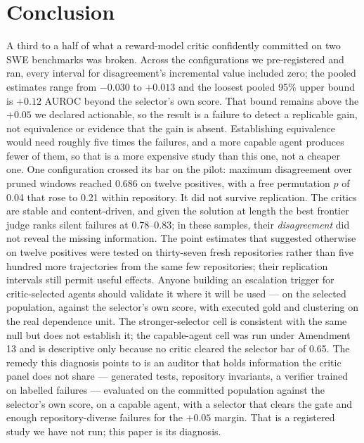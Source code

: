 \documentclass[11pt]{article}
\begin{document}
\section{Conclusion}
A third to a half of what a reward-model critic confidently committed on two SWE benchmarks was broken. Across the configurations we pre-registered and ran, every interval for disagreement's incremental value included zero; the pooled estimates range from $-0.030$ to $+0.013$ and the loosest pooled 95\% upper bound is $+0.12$ AUROC beyond the selector's own score. That bound remains above the $+0.05$ we declared actionable, so the result is a failure to detect a replicable gain, not equivalence or evidence that the gain is absent. Establishing equivalence would need roughly five times the failures, and a more capable agent produces fewer of them, so that is a more expensive study than this one, not a cheaper one. One configuration crossed its bar on the pilot: maximum disagreement over pruned windows reached 0.686 on twelve positives, with a free permutation $p$ of 0.04 that rose to 0.21 within repository. It did not survive replication. The critics are stable and content-driven, and given the solution at length the best frontier judge ranks silent failures at 0.78--0.83; in these samples, their \emph{disagreement} did not reveal the missing information. The point estimates that suggested otherwise on twelve positives were tested on thirty-seven fresh repositories rather than five hundred more trajectories from the same few repositories; their replication intervals still permit useful effects. Anyone building an escalation trigger for critic-selected agents should validate it where it will be used --- on the selected population, against the selector's own score, with executed gold and clustering on the real dependence unit. The stronger-selector cell is consistent with the same null but does not establish it; the capable-agent cell was run under Amendment 13 and is descriptive only because no critic cleared the selector bar of 0.65. The remedy this diagnosis points to is an auditor that holds information the critic panel does not share --- generated tests, repository invariants, a verifier trained on labelled failures --- evaluated on the committed population against the selector's own score, on a capable agent, with a selector that clears the gate and enough repository-diverse failures for the $+0.05$ margin. That is a registered study we have not run; this paper is its diagnosis.



\end{document}
